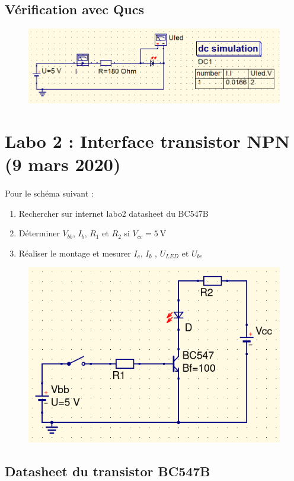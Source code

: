 \documentclass{article}
\begin{document}
\subsection{Vérification avec Qucs}
\begin{figure}[H]
    \centering
    \includegraphics[width=.8\linewidth]{images/labo1-qucs.png}
\end{figure}


\newpage
\section{Labo 2 : Interface transistor NPN (9 mars 2020)}
\paragraph{}
Pour le schéma suivant :
\begin{enumerate}
    \item Rechercher sur internet labo2 datasheet du BC547B
    \item Déterminer $V_{bb}$, $I_b$, $R_1$ et $R_2$ si $V_{cc} = \SI{5}{\volt}$
    \item Réaliser le montage et mesurer $I_c$, $I_b$ , $U_{LED}$ et $U_{be}$
\end{enumerate}
\begin{figure}[H]
    \centering
    \includegraphics[width=.6\linewidth]{images/labo2.png}
\end{figure}

\subsection{Datasheet du transistor BC547B}
\end{document}
